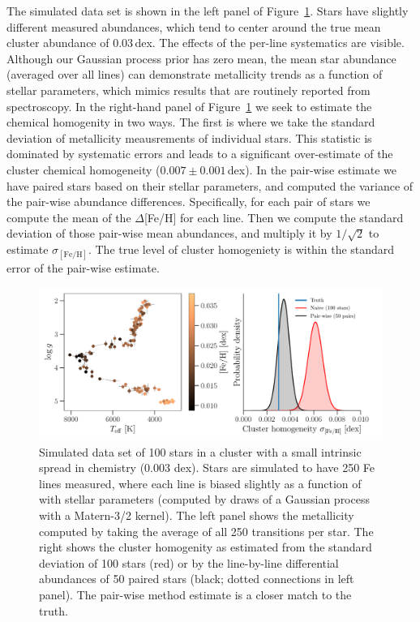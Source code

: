 \documentclass[modern]{aastex631}
\begin{document}
The simulated data set is shown in the left panel of Figure~\ref{fig:simulation}. Stars have slightly different measured abundances, which tend to center around the true mean cluster abundance of 0.03\,dex. The effects of the per-line systematics are visible. Although our Gaussian process prior has zero mean, the mean star abundance (averaged over all lines) can demonstrate metallicity trends as a function of stellar parameters, which mimics results that are routinely reported from spectroscopy. In the right-hand panel of Figure~\ref{fig:simulation} we seek to estimate the chemical homogenity in two ways. The first is where we take the standard deviation of metallicity meausrements of individual stars. This statistic is dominated by systematic errors and leads to a significant over-estimate of the cluster chemical homogeneity ($0.007 \pm 0.001$\,dex). In the pair-wise estimate we have paired stars based on their stellar parameters, and computed the variance of the pair-wise abundance differences. Specifically, for each pair of stars we compute the mean of the $\Delta$[Fe/H] for each line. Then we compute the standard deviation of those pair-wise mean abundances, and multiply it by $1/\sqrt{2}$ to estimate $\sigma_{\mathrm{[Fe/H]}}$. The true level of cluster homogeniety is within the standard error of the pair-wise estimate.\\


\begin{figure}
    \includegraphics*[width=\textwidth]{simulation.pdf}
    \caption{Simulated data set of 100 stars in a cluster with a small intrinsic spread in chemistry (0.003 dex). Stars are simulated to have 250 Fe lines measured, where each line is biased slightly as a function of with stellar parameters (computed by draws of a Gaussian process with a Matern-3/2 kernel). 
    The left panel shows the metallicity computed by taking the average of all 250 transitions per star. The right shows the cluster homogenity as estimated from the standard deviation of 100 stars (red) or by the line-by-line differential abundances of 50 paired stars (black; dotted connections in left panel). The pair-wise method estimate is a closer match to the truth.\label{fig:simulation}}
\end{figure}
\end{document}
